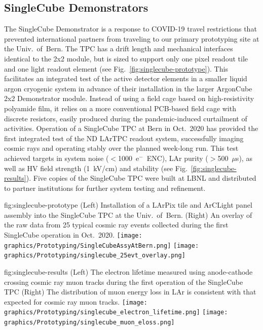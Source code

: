 \subsection{SingleCube Demonstrators}
\label{sec:singlecube-proto}

The SingleCube Demonstrator is a response to COVID-19 travel restrictions that prevented international partners from traveling to our primary prototyping site at the Univ.~of~Bern\@.
The TPC has a drift length and mechanical interfaces identical to the 2x2 module, but is sized to support only one pixel readout tile and one light readout element (see Fig.~\ref{fig:singlecube-prototype}). 
This facilitates an integrated test of the active detector elements in a smaller liquid argon cryogenic system in advance of their installation in the larger ArgonCube 2x2 Demonstrator module.
Instead of using a field cage based on high-resistivity polyamide film, it relies on a more conventional PCB-based field cage with discrete resistors, easily produced during the pandemic-induced curtailment of activities.
Operation of a SingleCube TPC at Bern in Oct.~2020 has provided the first integrated test of the ND LArTPC readout system, successfully imaging cosmic rays and operating stably over the planned week-long run.
This test achieved targets in system noise ($<$1000~e$^-$~ENC), LAr purity ($>$500~$\mu$s), as well as HV field strength (1~kV/cm) and stability (see Fig.~\ref{fig:singlecube-results}).
Five copies of the SingleCube TPC were built at LBNL and distributed to partner institutions for further system testing and refinement.

\begin{dunefigure}{fig:singlecube-prototype}
{(Left) Installation of a LArPix tile and ArCLight panel assembly into the SingleCube TPC at the Univ.~of~Bern.  (Right) An overlay of the raw data from 25 typical cosmic ray events collected during the first SingleCube operation in Oct.~2020\@.}
\texttt{[image: graphics/Prototyping/SingleCubeAssyAtBern.png]}
\texttt{[image: graphics/Prototyping/singlecube\_25evt\_overlay.png]}
\end{dunefigure}

\begin{dunefigure}{fig:singlecube-results}
{(Left) The electron lifetime measured using anode-cathode crossing cosmic ray muon tracks during the first operation of the SingleCube TPC (Right) The distribution of muon energy loss in LAr is consistent with that expected for cosmic ray muon tracks.}
\texttt{[image: graphics/Prototyping/singlecube\_electron\_lifetime.png]}
\texttt{[image: graphics/Prototyping/singlecube\_muon\_eloss.png]}
\end{dunefigure}


